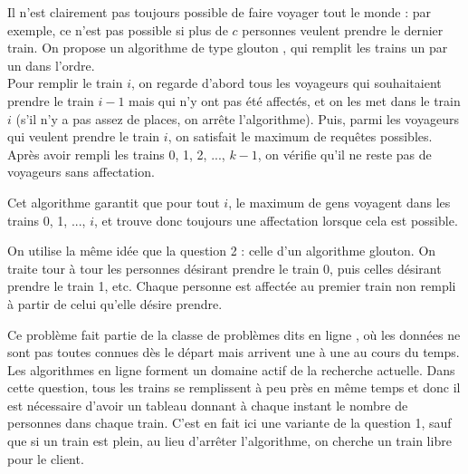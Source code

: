 

\Q
Il n'est clairement pas toujours possible de faire voyager tout le monde : par exemple, ce n'est pas possible si plus de $c$ personnes veulent prendre le dernier train. On propose un algorithme de type \og glouton \fg{}, qui remplit les trains un par un dans l'ordre.\\
Pour remplir le train $i$, on regarde d'abord tous les voyageurs qui souhaitaient prendre le train $i-1$ mais qui n'y ont pas été affectés, et on les met dans le train $i$ (s'il n'y a pas assez de places, on arrête l'algorithme). Puis, parmi les voyageurs qui veulent prendre le train $i$, on satisfait le maximum de requêtes possibles.\\
Après avoir rempli les trains 0, 1, 2, ..., $k-1$, on vérifie qu'il ne reste pas de voyageurs sans affectation.
\smallskip

Cet algorithme garantit que pour tout $i$, le maximum de gens voyagent dans les trains 0, 1, ..., $i$, et trouve donc toujours une affectation lorsque cela est possible.



\Q
On utilise la même idée que la question 2 : celle d'un algorithme glouton. On traite tour à tour les personnes désirant prendre le train 0, puis celles désirant prendre le train 1, etc. Chaque personne est affectée au premier train non rempli à partir de celui qu'elle désire prendre.



\Q
Ce problème fait partie de la classe de problèmes dits \og en ligne \fg{}, où les données ne sont pas toutes connues dès le départ mais arrivent une à une au cours du temps. Les algorithmes en ligne forment un domaine actif de la recherche actuelle. Dans cette question, tous les trains se remplissent à peu près en même temps et donc il est nécessaire d'avoir un tableau donnant à chaque instant le nombre de personnes dans chaque train. C'est en fait ici une variante de la question 1, sauf que si un train est plein, au lieu d'arrêter l'algorithme, on cherche un train libre pour le client.



\Fin

